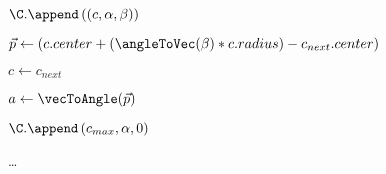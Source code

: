 \begin{algorithm}[p]
{    $\C.\append \left(
        \left(c , \alpha , \beta \right)
      \right)
    $
  
    $ \vec{p} \leftarrow \left( c.center + (\angleToVec(\beta) * c.radius ) - c_{next}.center\right)$
    
    $ c \leftarrow c_{next} $
    
    $  a \leftarrow \vecToAngle(\vec{p}) $
  
    }
  
    $\C.\append \left( c_{max}, \alpha, 0 \right)$
  
  \end{algorithm}
  
  

\dots
